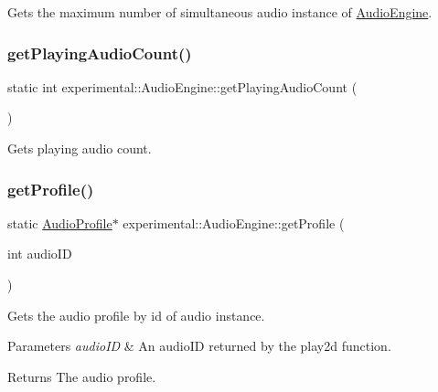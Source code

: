 Gets the maximum number of simultaneous audio instance of \hyperlink{classexperimental_1_1AudioEngine}{Audio\+Engine}. \mbox{\label{classexperimental_1_1AudioEngine_a47fa881c2d7a3e2604dd7c885f249f51}} 
\subsubsection{\texorpdfstring{get\+Playing\+Audio\+Count()}{getPlayingAudioCount()}}
{\footnotesize\ttfamily static int experimental\+::\+Audio\+Engine\+::get\+Playing\+Audio\+Count (\begin{DoxyParamCaption}{ }\end{DoxyParamCaption})\hspace{0.3cm}{\ttfamily [static]}}

Gets playing audio count. \mbox{\label{classexperimental_1_1AudioEngine_a9681b3ec692d7db066f9a4ce1564a5d2}} 
\subsubsection{\texorpdfstring{get\+Profile()}{getProfile()}\hspace{0.1cm}{\footnotesize\ttfamily [1/4]}}
{\footnotesize\ttfamily static \hyperlink{classexperimental_1_1AudioProfile}{Audio\+Profile}$\ast$ experimental\+::\+Audio\+Engine\+::get\+Profile (\begin{DoxyParamCaption}\item[{int}]{audio\+ID }\end{DoxyParamCaption})\hspace{0.3cm}{\ttfamily [static]}}

Gets the audio profile by id of audio instance.


\begin{DoxyParams}{Parameters}
{\em audio\+ID} & An audio\+ID returned by the play2d function. \\
\hline
\end{DoxyParams}
\begin{DoxyReturn}{Returns}
The audio profile. 
\end{DoxyReturn}
\mbox{\label{classexperimental_1_1AudioEngine_a9681b3ec692d7db066f9a4ce1564a5d2}} 
